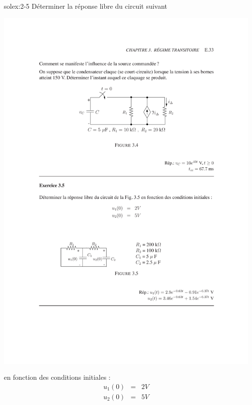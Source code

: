 \begin{exwithsol}{}{solex:2-5}
	\label{ex:2-5}
D\'eterminer la r\'eponse libre du circuit suivant
\begin{center}
	\includegraphics[width=0.8\linewidth]{exercices/ex-3-5}
\end{center}
en fonction des conditions initiales :
\begin{eqnarray*}
	u_1(0)&=&2V\\
	u_2(0)&=&5V\\
\end{eqnarray*}


\end{exwithsol}

